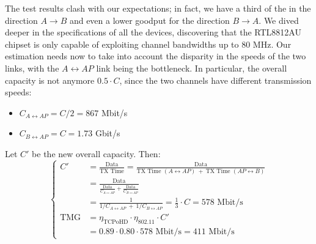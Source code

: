 The test results clash with our expectations; in fact, we have a third of the  in the direction $A\to B$ and even a lower goodput for the direction $B\to A$. 
We dived deeper in the specifications of all the devices, discovering that the RTL8812AU chipset is only capable of exploiting channel bandwidths up to 80 MHz. Our estimation needs now to take into account the disparity in the speeds of the two links, with the ${A\leftrightarrow AP}$ link being the bottleneck. In particular, the overall capacity is not anymore $0.5\cdot C$, since the two channels have different transmission speeds:
\begin{itemize}
    \item $C_{A\leftrightarrow AP}= C/2 = 867$ Mbit/s
    \item $C_{B\leftrightarrow AP}= C = 1.73$ Gbit/s
\end{itemize}
Let $C'$ be the new overall capacity. Then:
\begin{equation*}
\begin{cases}
    C'&=\frac{\text{Data}}{\text{TX Time}}=\frac{\text{Data}}{\text{TX Time }(A\leftrightarrow AP)\ +\ \text{TX Time }(AP\leftrightarrow B)}
    \\&=\frac{\text{Data}}{\frac{\text{Data}}{C_{A\leftrightarrow AP}}+\frac{\text{Data}}{C_{B\leftrightarrow AP}}}
    \\&=\frac{1}{1/C_{A\leftrightarrow AP}\ +\ 1/C_{B\leftrightarrow AP}}=\frac{1}{3}\cdot C=578\text{ Mbit/s}\\
    \text{TMG}&= \eta_{\text{TCPoHD}}\cdot\eta_{\text{802.11}}\cdot C'\\&=0.89\cdot0.80\cdot578\text{ Mbit/s}=411\text{ Mbit/s}
\end{cases}
\end{equation*}
